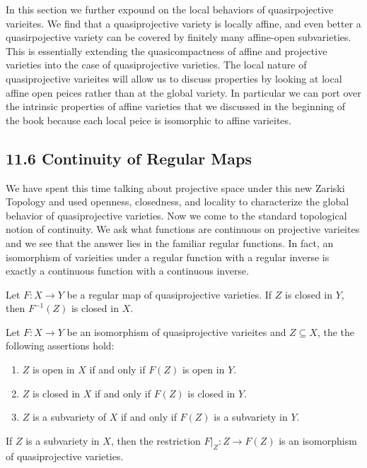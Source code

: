 \documentclass[40pt]{article}
\theoremstyle{remark}
\begin{document}
			\begin{summary}
				In this section we further expound on the local behaviors of quasirpojective varieites. We find that a quasiprojective variety is locally affine, and even better a quasirpojective variety can be covered by finitely many affine-open subvarieties. This is essentially extending the quasicompactness of affine and projective varieties into the case of quasiprojective varieties. The local nature of quasiprojective varieites will allow us to discuss properties by looking at local affine open peices rather than at the global variety. In particular we can port over the intrinsic properties of affine varieties that we discussed in the beginning of the book because each local peice is isomorphic to affine varieites.
			\end{summary}
			\subsection{11.6 Continuity of Regular Maps}
			We have spent this time talking about projective space under this new Zariski Topology and used openness, closedness, and locality to characterize the global behavior of quasiprojective varieties. Now we come to the standard topological notion of continuity. We ask what functions are continuous on projective varieites and we see that the answer lies in the familiar regular functions. In fact, an isomorphism of varieities under a regular function with a regular inverse is exactly a continuous function with a continuous inverse. 
			\begin{prop}
				Let $F : X \to Y$ be a regular map of quasiprojective varieties. If $Z$ is closed in $Y$, then $F^{-1}(Z)$ is closed in $X$.
			\end{prop}
			\begin{prop}
				Let $F : X \to Y$ be an isomorphism of quasiprojective varieites and $Z \subseteq X$, the the following assertions hold:
				\begin{enumerate}
					\item $Z$ is open in $X$ if and only if $F(Z)$ is open in $Y$.
					\item $Z$ is closed in $X$ if and only if $F(Z)$ is closed in $Y$.
					\item $Z$ is a subvariety of $X$ if and only if $F(Z)$ is a subvariety in $Y$. 
				\end{enumerate}
				If $Z$ is a subvariety in $X$, then the restriction $F|_Z : Z \to F(Z)$ is an isomorphism of quasiprojective varieties.
			\end{prop}
\end{document}
